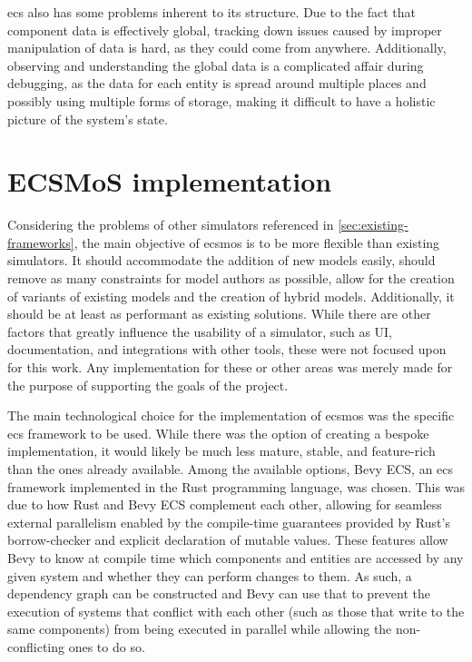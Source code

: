 \documentclass[twoside, 11pt]{article}
\begin{document}
\gls{ecs} also has some problems inherent to its structure. Due to the fact that component data is effectively global, tracking down issues caused by improper manipulation of data is hard, as they could come from anywhere. Additionally, observing and understanding the global data is a complicated affair during debugging, as the data for each entity is spread around multiple places and possibly using multiple forms of storage, making it difficult to have a holistic picture of the system's state.


\section{ECSMoS implementation} \label{sec:ecsmos-implementation}

Considering the problems of other simulators referenced in \autoref{sec:existing-frameworks}, the main objective of \gls{ecsmos} is to be more flexible than existing simulators. It should accommodate the addition of new models easily, should remove as many constraints for model authors as possible, allow for the creation of variants of existing models and the creation of hybrid models. Additionally, it should be at least as performant as existing solutions. While there are other factors that greatly influence the usability of a simulator, such as UI, documentation, and integrations with other tools, these were not focused upon for this work. Any implementation for these or other areas was merely made for the purpose of supporting the goals of the project.

The main technological choice for the implementation of \gls{ecsmos} was the specific \gls{ecs} framework to be used. While there was the option of creating a bespoke implementation, it would likely be much less mature, stable, and feature-rich than the ones already available. Among the available options, Bevy ECS, an \gls{ecs} framework implemented in the Rust programming language, was chosen. This was due to how Rust and Bevy ECS complement each other, allowing for seamless external parallelism enabled by the compile-time guarantees provided by Rust's borrow-checker and explicit declaration of mutable values. These features allow Bevy to know at compile time which components and entities are accessed by any given system and whether they can perform changes to them. As such, a dependency graph can be constructed and Bevy can use that to prevent the execution of systems that conflict with each other (such as those that write to the same components) from being executed in parallel while allowing the non-conflicting ones to do so.
\end{document}
